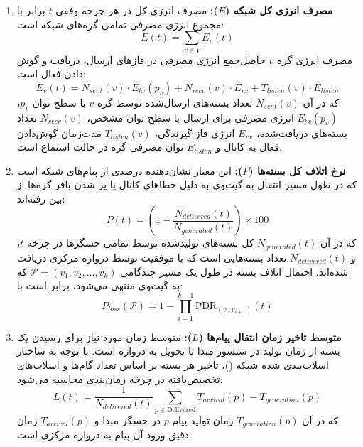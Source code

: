 \documentclass[oneside,openany,phd]{TMU-Thesis}
\begin{document}
\begin{enumerate}
    \item \textbf{مصرف انرژی کل شبکه ($E$):}
    مصرف انرژی کل در هر چرخه وفقی $t$ برابر با مجموع انرژی مصرفی تمامی گره‌های شبکه است:
    \begin{equation}
        E(t) = \sum_{v \in V} E_v(t)
    \end{equation}
    مصرف انرژی گره $v$ حاصل‌جمع انرژی مصرفی در فازهای ارسال، دریافت و گوش دادن فعال است:
    \begin{equation}
        E_v(t) = N_{sent}(v) \cdot E_{tx}(p_v) + N_{recv}(v) \cdot E_{rx} + T_{listen}(v) \cdot E_{listen}
    \end{equation}
    که در آن $N_{sent}(v)$ تعداد بسته‌های ارسال‌شده توسط گره $v$ با سطح توان $p_v$، $E_{tx}(p_v)$ انرژی مصرفی برای ارسال با سطح توان مشخص، $N_{recv}(v)$ تعداد بسته‌های دریافت‌شده، $E_{rx}$ انرژی فاز گیرندگی، $T_{listen}(v)$ مدت‌زمان گوش‌دادن فعال به کانال و $E_{listen}$ توان مصرفی گره در حالت استماع است.
    
    \item \textbf{نرخ اتلاف کل بسته‌ها ($P$):}
    این معیار نشان‌دهنده درصدی از پیام‌های شبکه است که در طول مسیر انتقال به گیت‌وی به دلیل خطاهای کانال یا پر شدن بافر گره‌ها از بین رفته‌اند:
    \begin{equation}\label{eq:P_total}
        P(t) = \left( 1 - \frac{N_{delivered}(t)}{N_{generated}(t)} \right) \times 100
    \end{equation}
    که در آن $N_{generated}(t)$ کل بسته‌های تولید‌شده توسط تمامی حسگرها در چرخه $t$، و $N_{delivered}(t)$ تعداد بسته‌هایی است که با موفقیت توسط دروازه مرکزی دریافت شده‌اند. احتمال اتلاف بسته در طول یک مسیر چندگامی $\mathcal{P} = (v_1, v_2, \ldots, v_k)$ که به گیت‌وی منتهی می‌شود، برابر است با:
    \begin{equation}\label{eq:P_loss_path}
        P_{loss}(\mathcal{P}) = 1 - \prod_{i=1}^{k-1} \text{PDR}_{(v_i, v_{i+1})}(t)
    \end{equation}
    
    \item \textbf{متوسط تاخیر زمان انتقال پیام‌ها ($L$):}
    متوسط زمان مورد نیاز برای رسیدن یک بسته از زمان تولید در سنسور مبدا تا تحویل به دروازه است. با توجه به ساختار اسلات‌بندی شده شبکه ()، تاخیر هر بسته بر اساس تعداد گام‌ها و اسلات‌های تخصیص‌یافته در چرخه زمان‌بندی محاسبه می‌شود:
    \begin{equation}\label{eq:L_total}
        L(t) = \frac{1}{N_{delivered}(t)} \sum_{p \in \text{Delivered}} T_{arrival}(p) - T_{generation}(p)
    \end{equation}
    که در آن $T_{generation}(p)$ زمان تولید پیام $p$ در حسگر مبدا و $T_{arrival}(p)$ زمان دقیق ورود آن پیام به دروازه مرکزی است.
\end{enumerate}
\end{document}
